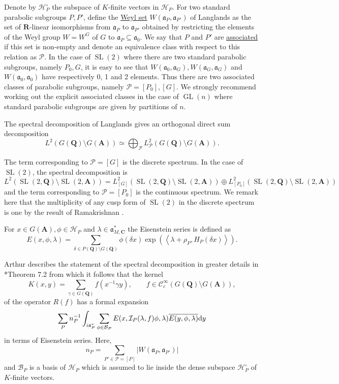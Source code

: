 \documentclass[11pt]{amsart}
\def\A{\mathbf A}
\def\C{\mathbf C}
\def\Q{\mathbf Q}
\def\R{\mathbf R}
\def\BBB{\mathcal B}
\def\CCC{\mathcal C}
\def\HHH{\mathcal H}
\def\III{\mathcal I}
\def\PPP{\mathcal P}
\def\aaa{\mathfrak a}
\def\cb#1{{\color{blue}#1}}
\def\d{\text d}
\def\bs{\setminus} 			%
\def\gl{\operatorname{GL}}
\def\Ltwo{L^2}
\def\mod#1{\lvert #1 \rvert} %
\def\se{\subseteq}
\def\sl{\operatorname{SL}}
\def\sprod#1#2{\left\langle #1 , #2 \right\rangle}  %
\theoremstyle{remark}
\begin{document}
Denote by $\HHH_P^\circ$ the subspace of $K$-finite vectors in $\HHH_P$. For two standard parabolic subgroups $P, P'$, define the \underline{Weyl set} $W(\aaa_P, \aaa_{P'})$ of Langlands as the set of $\R$-linear isomorphisms from $\aaa_P$ to $\aaa_{P'}$ obtained by restricting the elements of the Weyl group $W = W^G$ of $G$ to $\aaa_P \se \aaa_0$. We say that $P$ and $P'$ are \underline{associated} if this set is non-empty and denote an equivalence class with respect to this relation as $\PPP$. \cb{In the case of $\sl(2)$ where there are two standard parabolic subgroups, namely $P_0, G$, it is easy to see that $W(\aaa_0, \aaa_G), W(\aaa_G, \aaa_G)$ and $W(\aaa_0, \aaa_0)$ have respectively 0, 1 and 2 elements. Thus there are two associated classes of parabolic subgroups, namely $\PPP = [P_0], [G]$. We strongly recommend working out the explicit associated classes in the case of $\gl(n)$ where standard parabolic subgroups are given by partitions of $n$.}

The spectral decomposition of Langlands gives an orthogonal direct sum decomposition
\[ \Ltwo(G(\Q)\bs G(\A)) \simeq \bigoplus_{\PPP} \Ltwo_\PPP(G(\Q)\bs G(\A)). \]

The term corresponding to $\PPP = [G]$ is the discrete spectrum. 
\cb{In the case of $\sl(2)$, the spectral decomposition is 
\[ \Ltwo(\sl(2, \Q)\bs \sl(2, \A)) = \Ltwo_{[G]} (\sl(2, \Q)\bs \sl(2, \A)) \oplus \Ltwo_{[P_0]} (\sl(2, \Q)\bs \sl(2, \A)) \]
and the term corresponding to $\PPP = [P_0]$ is the continuous spectrum. We remark here that the multiplicity of any cusp form of $\sl(2)$ in the discrete spectrum is one by the result of Ramakrishnan \cite{MR1792292}.}

For $x \in G(\A), \phi \in \HHH_P$ and $\lambda \in \aaa_{M, \C}^*$ the Eisenstein series is defined as
\[ E(x, \phi, \lambda) = \sum_{\delta \in P(\Q) \bs G(\Q)} \phi(\delta x) 
		\exp(\sprod{\lambda + \rho_P}{H_P(\delta x)}). \]

Arthur describes the statement of the spectral decomposition in greater details in \cite{clay}*{Theorem 7.2} from which it follows that the kernel 
\[ K(x, y) = \sum_{\gamma \in G(\Q)} f(x^{-1}\gamma y) , \qquad f \in \CCC_c^\infty(G(\Q)\bs G(\A)),\]
of the operator $R(f)$ has a formal expansion
\[ \sum_{P} n_P^{-1} \int_{i\aaa_P^*} \sum_{\phi \in \BBB_P} E(x, \III_P(\lambda, f)\phi, \lambda) 
		\overline{E(y, \phi, \lambda)} \d y \]
in terms of Eisenstein series. Here, 
\[ n_P = \sum_{P' \in \PPP = [P]} \mod{W(\aaa_P, \aaa_{P'})} \]
and $\BBB_P$ is a basis of $\HHH_P$ which is assumed to lie inside the dense subspace $\HHH_P^\circ$ of $K$-finite vectors. 
\end{document}

